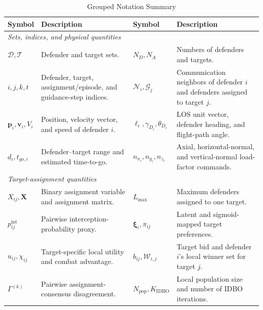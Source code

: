 \documentclass[lettersize,journal]{IEEEtran}
\providecommand{\DIFadd}[1]{{\protect\color{blue}#1}} %
\providecommand{\DIFaddFL}[1]{\DIFadd{#1}} %
\begin{document}
\begin{table}[!t]
\centering
\caption{\DIFaddFL{Grouped Notation Summary}}
\label{tab:notation}
\renewcommand{\arraystretch}{1.12}
\footnotesize
\begin{tabular}{@{}p{}p{}p{}p{}@{}}
\toprule
\DIFaddFL{Symbol }& \DIFaddFL{Description }& \DIFaddFL{Symbol }& \DIFaddFL{Description }\\
\midrule
\multicolumn{4}{l}{\emph{Sets, indices, and physical quantities}}\\
\DIFaddFL{$\mathcal D,\mathcal T$ }& \DIFaddFL{Defender and target sets. }&
\DIFaddFL{$N_D,N_A$ }& \DIFaddFL{Numbers of defenders and targets.}\\
\DIFaddFL{$i,j,k,t$ }& \DIFaddFL{Defender, target, assignment/episode, and guidance-step indices. }&
\DIFaddFL{$\mathcal N_i,\mathcal G_j$ }& \DIFaddFL{Communication neighbors of defender $i$ and defenders assigned to target $j$.}\\
\DIFaddFL{$\mathbf p_i,\mathbf v_i,V_i$ }& \DIFaddFL{Position, velocity vector, and speed of defender $i$. }&
\DIFaddFL{$\boldsymbol\ell_i,\gamma_{D_i},\theta_{D_i}$ }& \DIFaddFL{LOS unit vector, defender heading, and flight-path angle.}\\
\DIFaddFL{$d_i,t_{go,i}$ }& \DIFaddFL{Defender--target range and estimated time-to-go. }&
\DIFaddFL{$n_{x_i},n_{y_i},n_{z_i}$ }& \DIFaddFL{Axial, horizontal-normal, and vertical-normal load-factor commands.}\\
\midrule
\multicolumn{4}{l}{\emph{Target-assignment quantities}}\\
\DIFaddFL{$X_{ij},\mathbf X$ }& \DIFaddFL{Binary assignment variable and assignment matrix. }&
\DIFaddFL{$L_{\max}$ }& \DIFaddFL{Maximum defenders assigned to one target.}\\
\DIFaddFL{$p_{ij}^{\mathrm{int}}$ }& \DIFaddFL{Pairwise interception-probability proxy. }&
\DIFaddFL{$\boldsymbol\xi_i,\pi_{ij}$ }& \DIFaddFL{Latent and sigmoid-mapped target preferences.}\\
\DIFaddFL{$u_{ij},\chi_{ij}$ }& \DIFaddFL{Target-specific local utility and combat advantage. }&
\DIFaddFL{$b_{ij},\mathcal W_{i,j}$ }& \DIFaddFL{Target bid and defender $i$'s local winner set for target $j$.}\\
\DIFaddFL{$\Gamma^{(k)}$ }& \DIFaddFL{Pairwise assignment-consensus disagreement. }&
\DIFaddFL{$N_{\mathrm{pop}},K_{\mathrm{IDBO}}$ }& \DIFaddFL{Local population size and number of IDBO iterations.}\\

\end{tabular}
\end{table}
\end{document}
